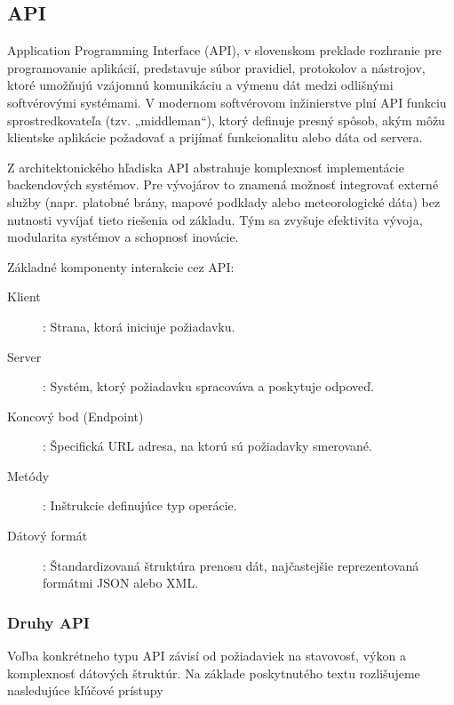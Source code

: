 \subsection{API}

Application Programming Interface (API), v slovenskom preklade rozhranie pre programovanie aplikácií, predstavuje súbor pravidiel, protokolov a nástrojov, ktoré umožňujú vzájomnú komunikáciu a výmenu dát medzi odlišnými softvérovými systémami. V modernom softvérovom inžinierstve plní API funkciu sprostredkovateľa (tzv. „middleman“), ktorý definuje presný spôsob, akým môžu klientske aplikácie požadovať a prijímať funkcionalitu alebo dáta od servera.

Z architektonického hľadiska API abstrahuje komplexnosť implementácie backendových systémov. Pre vývojárov to znamená možnosť integrovať externé služby (napr. platobné brány, mapové podklady alebo meteorologické dáta) bez nutnosti vyvíjať tieto riešenia od základu. Tým sa zvyšuje efektivita vývoja, modularita systémov a schopnosť inovácie.

Základné komponenty interakcie cez API:
\begin{description}
    
\item[Klient]: Strana, ktorá iniciuje požiadavku.

\item[Server]: Systém, ktorý požiadavku spracováva a poskytuje odpoveď.

\item[Koncový bod (Endpoint)]: Špecifická URL adresa, na ktorú sú požiadavky smerované.

\item[Metódy]: Inštrukcie definujúce typ operácie.

\item[Dátový formát]: Štandardizovaná štruktúra prenosu dát, najčastejšie reprezentovaná formátmi JSON alebo XML.

\end{description}



\subsubsection{Druhy API}
Voľba konkrétneho typu API závisí od požiadaviek na stavovosť, výkon a komplexnosť dátových štruktúr. Na základe poskytnutého textu rozlišujeme nasledujúce kľúčové prístupy

